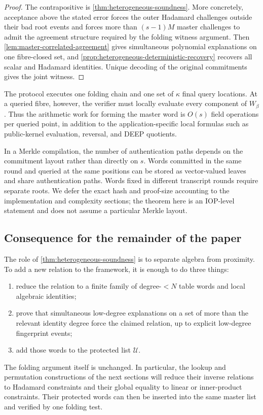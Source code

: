 \begin{proof}
The contrapositive is \cref{thm:heterogeneous-soundness}.  More concretely, acceptance above the stated error forces the outer Hadamard challenges outside their bad root events and forces more than $(s-1)M$ master challenges to admit the agreement structure required by the folding witness argument.  Then \cref{lem:master-correlated-agreement} gives simultaneous polynomial explanations on one fibre-closed set, and \cref{prop:heterogeneous-deterministic-recovery} recovers all scalar and Hadamard identities.  Unique decoding of the original commitments gives the joint witness.
\end{proof}

\begin{remark}
\label{rem:heterogeneous-verifier-cost}
The protocol executes one folding chain and one set of $\kappa$ final query locations.  At a queried fibre, however, the verifier must locally evaluate every component of $W_\beta$.  Thus the arithmetic work for forming the master word is $O(s)$ field operations per queried point, in addition to the application-specific local formulas such as public-kernel evaluation, reversal, and DEEP quotients.

In a Merkle compilation, the number of authentication paths depends on the commitment layout rather than directly on $s$.  Words committed in the same round and queried at the same positions can be stored as vector-valued leaves and share authentication paths.  Words fixed in different transcript rounds require separate roots.  We defer the exact hash and proof-size accounting to the implementation and complexity sections; the theorem here is an IOP-level statement and does not assume a particular Merkle layout.
\end{remark}

\subsection{Consequence for the remainder of the paper}
\label{sec:batching-consequence}

The role of \cref{thm:heterogeneous-soundness} is to separate algebra from proximity.  To add a new relation to the framework, it is enough to do three things:
\begin{enumerate}[label=(\arabic*),leftmargin=*]
  \item reduce the relation to a finite family of degree-$<N$ table words and local algebraic identities;
  \item prove that simultaneous low-degree explanations on a set of more than the relevant identity degree force the claimed relation, up to explicit low-degree fingerprint events;
  \item add those words to the protected list $\mathcal U$.
\end{enumerate}
The folding argument itself is unchanged.  In particular, the lookup and permutation constructions of the next sections will reduce their inverse relations to Hadamard constraints and their global equality to linear or inner-product constraints.  Their protected words can then be inserted into the same master list and verified by one folding test.
